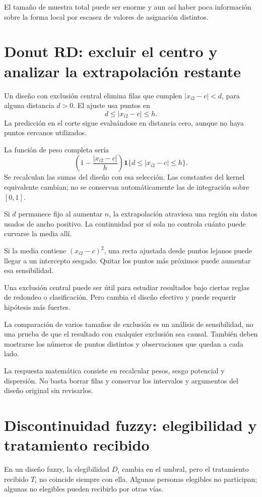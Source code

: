 \documentclass[11pt,a4paper]{article}
\begin{document}
El tamaño de muestra total puede ser enorme
y aun así haber poca información
sobre la forma local por escasez
de valores de asignación distintos.

\clearpage
\section{Donut RD: excluir el centro y analizar la extrapolación restante}\label{unidad41}
Un diseño con exclusión central elimina
filas que cumplen \(|x_{i2}-c|<d\),
para alguna distancia \(d>0\).
El ajuste usa puntos en
\[
d\le|x_{i2}-c|\le h.
\]
La predicción en el corte sigue evaluándose
en distancia cero, aunque no haya
puntos cercanos utilizados.

La función de peso completa sería
\[
\left(1-\frac{|x_{i2}-c|}{h}\right)
\mathbf1\{d\le|x_{i2}-c|\le h\}.
\]
Se recalculan las sumas del diseño
con esa selección. Las constantes
del kernel equivalente cambian;
no se conservan automáticamente
las de integración sobre \([0,1]\).

Si \(d\) permanece fijo al aumentar \(n\),
la extrapolación atraviesa una región
sin datos usados de ancho positivo.
La continuidad por sí sola no controla
cuánto puede curvarse la media allí.

\begin{ejemplo}
Si la media contiene \((x_{i2}-c)^2\),
una recta ajustada desde puntos lejanos
puede llegar a un intercepto sesgado.
Quitar los puntos más próximos
puede aumentar esa sensibilidad.
\end{ejemplo}
Una exclusión central puede ser útil
para estudiar resultados bajo ciertas
reglas de redondeo o clasificación.
Pero cambia el diseño efectivo
y puede requerir hipótesis más fuertes.

La comparación de varios tamaños
de exclusión es un análisis de sensibilidad,
no una prueba de que el resultado
con cualquier exclusión sea causal.
También deben mostrarse los números
de puntos distintos y observaciones
que quedan a cada lado.

La respuesta matemática consiste en
recalcular pesos, sesgo potencial y dispersión.
No basta borrar filas y conservar
los intervalos y argumentos del
diseño original sin revisarlos.

\clearpage
\section{Discontinuidad fuzzy: elegibilidad y tratamiento recibido}\label{unidad42}
En un diseño fuzzy, la elegibilidad \(D_i\)
cambia en el umbral, pero el tratamiento
recibido \(T_i\) no coincide siempre con ella.
Algunas personas elegibles no participan;
algunas no elegibles pueden recibirlo
por otras vías.
\end{document}
